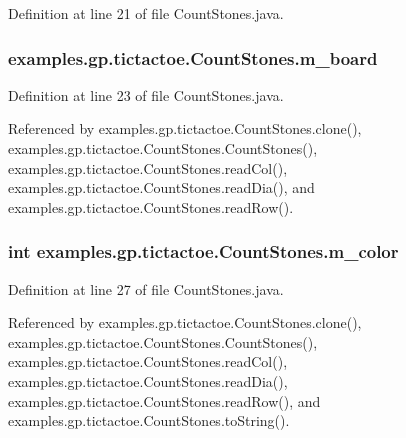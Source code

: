 Definition at line 21 of file Count\-Stones.\-java.

\hypertarget{classexamples_1_1gp_1_1tictactoe_1_1_count_stones_aeac89aba88108a9c2db1cb5a3932d6b6}{
\subsubsection[{m\-\_\-board}]{ examples.\-gp.\-tictactoe.\-Count\-Stones.\-m\-\_\-board\hspace{0.3cm}{\ttfamily [private]}}}\label{classexamples_1_1gp_1_1tictactoe_1_1_count_stones_aeac89aba88108a9c2db1cb5a3932d6b6}


Definition at line 23 of file Count\-Stones.\-java.



Referenced by examples.\-gp.\-tictactoe.\-Count\-Stones.\-clone(), examples.\-gp.\-tictactoe.\-Count\-Stones.\-Count\-Stones(), examples.\-gp.\-tictactoe.\-Count\-Stones.\-read\-Col(), examples.\-gp.\-tictactoe.\-Count\-Stones.\-read\-Dia(), and examples.\-gp.\-tictactoe.\-Count\-Stones.\-read\-Row().

\hypertarget{classexamples_1_1gp_1_1tictactoe_1_1_count_stones_ae48453c32d4945018ac6ebff3923d9d8}{
\subsubsection[{m\-\_\-color}]{\setlength{\rightskip}{0pt plus 5cm}int examples.\-gp.\-tictactoe.\-Count\-Stones.\-m\-\_\-color\hspace{0.3cm}{\ttfamily [private]}}}\label{classexamples_1_1gp_1_1tictactoe_1_1_count_stones_ae48453c32d4945018ac6ebff3923d9d8}


Definition at line 27 of file Count\-Stones.\-java.



Referenced by examples.\-gp.\-tictactoe.\-Count\-Stones.\-clone(), examples.\-gp.\-tictactoe.\-Count\-Stones.\-Count\-Stones(), examples.\-gp.\-tictactoe.\-Count\-Stones.\-read\-Col(), examples.\-gp.\-tictactoe.\-Count\-Stones.\-read\-Dia(), examples.\-gp.\-tictactoe.\-Count\-Stones.\-read\-Row(), and examples.\-gp.\-tictactoe.\-Count\-Stones.\-to\-String().

